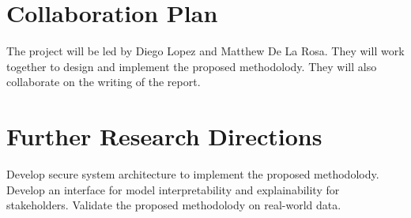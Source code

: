 \documentclass[12pt]{article}
\begin{document}
\section{Collaboration Plan}
The project will be led by Diego Lopez and Matthew De La Rosa.
They will work together to design and implement the proposed methodolody.
They will also collaborate on the writing of the report.

\section{Further Research Directions}
Develop secure system architecture to implement the proposed methodolody.
Develop an interface for model interpretability and explainability for stakeholders.
Validate the proposed methodolody on real-world data.




\end{document}
